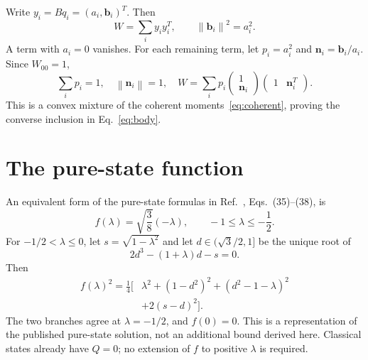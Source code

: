 \documentclass[aps,pra,reprint,amsmath,amssymb,superscriptaddress,longbibliography]{revtex4-2}
\newcommand{\norm}[1]{\left\lVert #1\right\rVert}
\begin{document}
Write \(y_i=Bq_i=(a_i,\bm b_i)^T\). Then
\begin{equation}
 W=\sum_i y_i y_i^T,\qquad
 \norm{\bm b_i}^2=a_i^2.
\end{equation}
A term with \(a_i=0\) vanishes. For each remaining term, let \(p_i=a_i^2\) and \(\bm n_i=\bm b_i/a_i\). Since \(W_{00}=1\),
\begin{equation}
 \sum_i p_i=1,\quad \norm{\bm n_i}=1,\quad
 W=\sum_i p_i
       \begin{pmatrix}1\\\bm n_i\end{pmatrix}
       \begin{pmatrix}1&\bm n_i^T\end{pmatrix}.
\end{equation}
This is a convex mixture of the coherent moments~\eqref{eq:coherent}, proving the converse inclusion in Eq.~\eqref{eq:body}.

\section{The pure-state function}
\label{app:f}

An equivalent form of the pure-state formulas in Ref.~\cite{Bohnet2016}, Eqs.~(35)--(38), is
\begin{equation}
 f(\lambda)=\sqrt{\frac38}(-\lambda),
 \qquad -1\leq\lambda\leq-\frac12.
\end{equation}
For \(-1/2<\lambda\leq0\), let \(s=\sqrt{1-\lambda^2}\) and let \(d\in(\sqrt3/2,1]\) be the unique root of
\begin{equation}
 2d^3-(1+\lambda)d-s=0.
\end{equation}
Then
\begin{align}
 f(\lambda)^2=\frac14\big[&
 \lambda^2+(1-d^2)^2+(d^2-1-\lambda)^2\nonumber\\
 &+2(s-d)^2\big].
\end{align}
The two branches agree at \(\lambda=-1/2\), and \(f(0)=0\). This is a representation of the published pure-state solution, not an additional bound derived here. Classical states already have \(Q=0\); no extension of \(f\) to positive \(\lambda\) is required.


\end{document}
